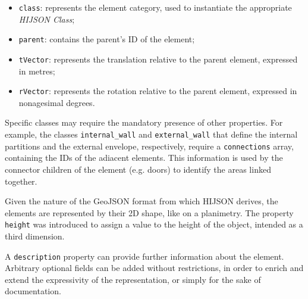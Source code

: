 \begin{itemize}
\itemsep1pt\parskip0pt
\item
 {\tt class}: represents the element category, used to instantiate
 the appropriate \emph{HIJSON Class};
\item
 {\tt parent}: contains the parent's ID of the element;
\item
 {\tt tVector}: represents the translation relative to 
 the parent element, expressed in metres;
\item
 {\tt rVector}: represents the rotation relative to 
 the parent element, expressed in nonagesimal degrees.
\end{itemize}

Specific classes may require the mandatory presence of other properties. For
example, the classes {\tt internal\_wall} and {\tt external\_wall} that
define the internal partitions and the external envelope, respectively, require a {\tt connections}
array, containing the IDs of the adiacent elements. This information is used
by the connector children of the element (e.g. doors) to identify the
areas linked together.

Given the nature of the GeoJSON format from which HIJSON derives, the elements
are represented by their 2D shape, like on a planimetry. The property {\tt
height} was introduced to assign a value to the height of the object, intended
as a third dimension.

A {\tt description} property can provide further information about
the element.
Arbitrary optional fields can be added without restrictions, in order to
enrich and extend the expressivity of the representation, or simply for the sake of 
documentation.
